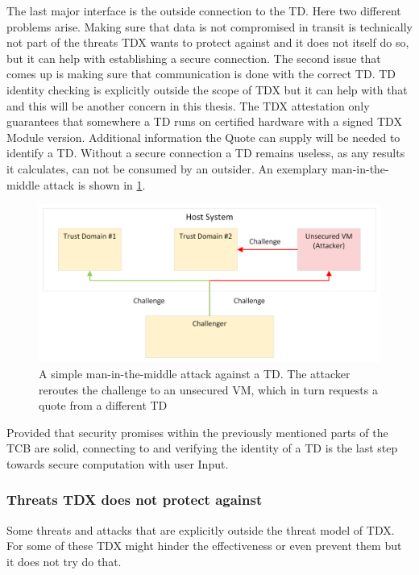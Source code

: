 
The last major interface is the outside connection to the TD. Here two different problems arise. Making sure that data is not compromised in transit is technically not part of the threats TDX wants to protect against and it does not itself do so,  but it can help with establishing a secure connection. The second issue that comes up is making sure that communication is done with the correct TD. TD identity checking is explicitly outside the scope of TDX but it can help with that and this will be another concern in this thesis. The TDX attestation only guarantees that somewhere a TD runs on certified hardware with a signed TDX Module version. Additional information the Quote can supply will be needed to identify a TD. Without a secure connection a TD remains useless, as any results it calculates, can not be consumed by an outsider. An exemplary man-in-the-middle attack is shown in \ref{fig:man_in_the_middle}.
\begin{figure}
   \centering
       \includegraphics[width=.75\textwidth]{figures/Man-In-The-Middle.png} 
 \caption{A simple man-in-the-middle attack against a TD. The attacker reroutes the challenge to an unsecured VM, which in turn requests a quote from a different TD}
 \label{fig:man_in_the_middle}
\end{figure}
Provided that security promises within the previously mentioned parts of the TCB are solid, connecting to and verifying the identity of a \Gls{TD} is the last step towards secure computation with user Input.

\subsubsection{Threats TDX does not protect against}

Some threats and attacks that are explicitly outside the threat model of TDX. For some of these TDX might hinder the effectiveness or even prevent them but it does not try do that.


